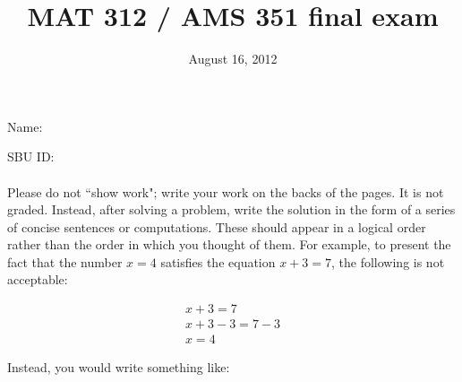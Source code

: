 \documentclass[12pt]{article}
\title{MAT 312 / AMS 351 final exam}
\date{August 16, 2012}
\begin{document}
\maketitle 
Name:

SBU ID:
\\
\\
Please do not ``show work"; write your work on the backs of the pages. It is not graded.  Instead, after solving a problem, write the solution in the form of a series of concise sentences or computations. These should appear in a logical order rather than the order in which you thought of them.
For example, to present the fact that the number $x=4$ satisfies the equation $x+3=7$, the following is not acceptable:

\begin{align*}
x+3=7 \\
x+3-3=7-3 \\
x=4
\end{align*}

Instead, you would write something like:
\end{document}
